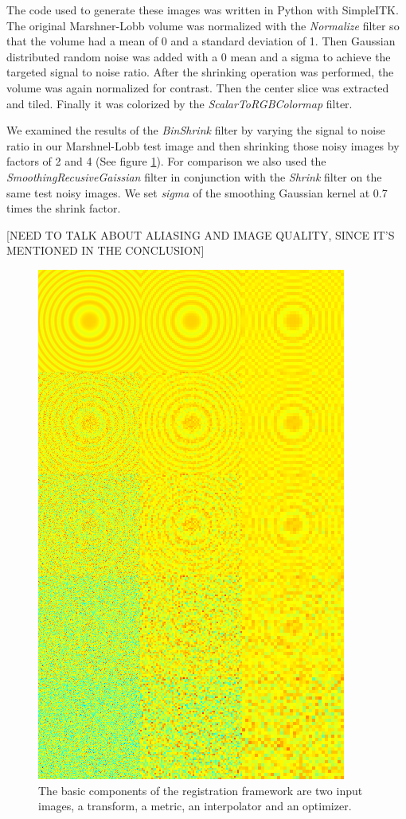 \documentclass{InsightArticle}
\begin{document}
The code used to generate these images was written in Python with
SimpleITK. The original Marshner-Lobb volume was normalized with the
\textit{Normalize} filter so that the volume had a mean
of 0 and a standard deviation of 1. Then Gaussian distributed random
noise was added with a 0 mean and a sigma to achieve the targeted
signal to noise ratio. After the shrinking operation was performed,
the volume was again normalized for contrast. Then the center slice
was extracted and tiled. Finally it was colorized by the
\textit{ScalarToRGBColormap} filter\cite{Tustison2009}.

We examined the results of the \textit{BinShrink} filter by varying the
signal to noise ratio in our Marshnel-Lobb test image and then shrinking those noisy
images by factors of 2 and 4 (See figure
\ref{fig:BinShrinkComparison}). For comparison we also used the
\textit{SmoothingRecusiveGaissian} filter in conjunction with the
\textit{Shrink} filter on the same test noisy images.  We set \textit{sigma} of the
smoothing Gaussian kernel at 0.7 times the shrink factor.

[NEED TO TALK ABOUT ALIASING AND IMAGE QUALITY, SINCE IT'S MENTIONED IN THE CONCLUSION]

\begin{figure}
  \centering
  \includegraphics[width=0.4\linewidth]{images/binshrink_hot.png}
  \caption[Registration Framework Components]{The basic components of the
    registration framework are two input images, a transform, a metric, an
    interpolator and an optimizer.}
  \label{fig:BinShrinkComparison}
\end{figure}
\end{document}
